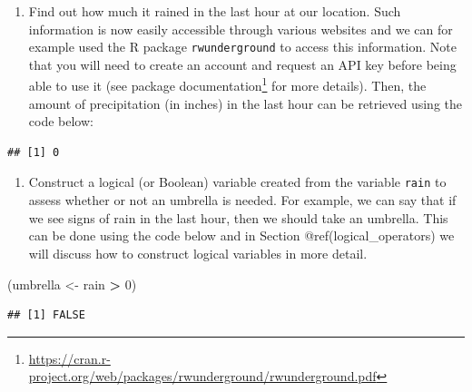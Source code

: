 \documentclass[12pt,]{krantz}
\newenvironment{Shaded}{\begin{snugshade}}{\end{snugshade}}
\newcommand{\KeywordTok}[1]{\textcolor[rgb]{0.27,0.27,0.27}{\textbf{#1}}}
\newcommand{\DataTypeTok}[1]{\textcolor[rgb]{0.27,0.27,0.27}{#1}}
\newcommand{\DecValTok}[1]{\textcolor[rgb]{0.06,0.06,0.06}{#1}}
\newcommand{\StringTok}[1]{\textcolor[rgb]{0.5,0.5,0.5}{#1}}
\newcommand{\OtherTok}[1]{\textcolor[rgb]{0.37,0.37,0.37}{#1}}
\newcommand{\OperatorTok}[1]{\textcolor[rgb]{0.43,0.43,0.43}{\textbf{#1}}}
\newcommand{\NormalTok}[1]{#1}
\providecommand{\tightlist}{%
  \setlength{\itemsep}{0pt}\setlength{\parskip}{0pt}}
\renewcommand{\href}[2]{#2\footnote{\url{#1}}}
\begin{document}
\begin{enumerate}
\def\labelenumi{\arabic{enumi})}
\tightlist
\item
  Find out how much it rained in the last hour at our location. Such
  information is now easily accessible through various websites and we
  can for example used the R package \texttt{rwunderground} to access
  this information. Note that you will need to create an account and
  request an API key before being able to use it (see
  \href{https://cran.r-project.org/web/packages/rwunderground/rwunderground.pdf}{package
  documentation} for more details). Then, the amount of precipitation
  (in inches) in the last hour can be retrieved using the code below:
\end{enumerate}

\begin{Shaded}
\end{Shaded}

\begin{verbatim}
## [1] 0
\end{verbatim}

\begin{enumerate}
\def\labelenumi{\arabic{enumi})}
\setcounter{enumi}{1}
\tightlist
\item
  Construct a logical (or Boolean) variable created from the variable
  \texttt{rain} to assess whether or not an umbrella is needed. For
  example, we can say that if we see signs of rain in the last hour,
  then we should take an umbrella. This can be done using the code below
  and in Section @ref(logical\_operators) we will discuss how to
  construct logical variables in more detail.
\end{enumerate}

\begin{Shaded}
\begin{Highlighting}[]
\NormalTok{(umbrella <-}\StringTok{ }\NormalTok{rain }\OperatorTok{>}\StringTok{ }\DecValTok{0}\NormalTok{)}
\end{Highlighting}
\end{Shaded}

\begin{verbatim}
## [1] FALSE
\end{verbatim}
\end{document}
